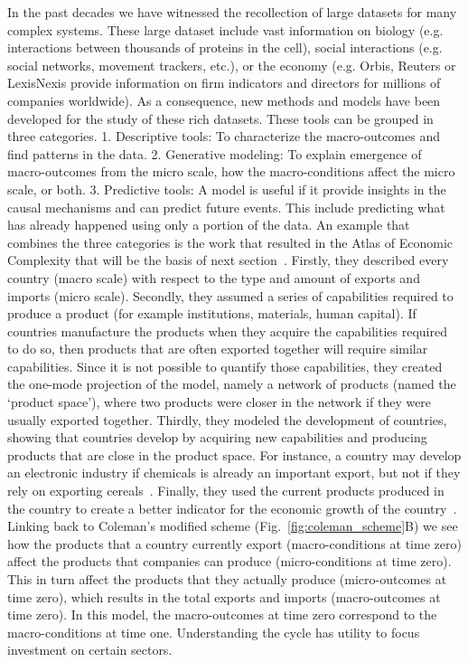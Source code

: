 In the past decades we have witnessed the recollection of large datasets for many complex systems. 
These large dataset include vast information on biology (e.g. interactions between thousands of proteins in the cell),
social interactions (e.g. social networks, movement trackers, etc.),
or the economy (e.g. Orbis, Reuters or LexisNexis provide information on firm indicators and directors for millions of companies worldwide).
As a consequence, new methods and models have been developed for the study of these rich datasets. 
These tools can be grouped in three categories.
1. Descriptive tools: To characterize the macro-outcomes and find patterns in the data.
2. Generative modeling: To explain emergence of macro-outcomes from the micro scale, how the macro-conditions affect the micro scale, or both.
3. Predictive tools: A model is useful if it provide insights in the causal mechanisms and can predict future events. This include predicting what has already happened using only a portion of the data. 
An example that combines the three categories is the work that resulted in the Atlas of Economic Complexity that will be the basis of next section~\citep{Hausmann2006,hidalgo2007,hidalgo2009,hausmann2011}.
Firstly, they described every country (macro scale) with respect to the type and amount of exports and imports (micro scale). 
Secondly, they assumed a series of capabilities required to produce a product (for example institutions, materials, human capital). 
If countries manufacture the products when they acquire the capabilities required to do so, 
then products that are often exported together will require similar capabilities.
Since it is not possible to quantify those capabilities, they created the one-mode projection of the model,
namely a network of products (named the `product space'), 
where two products were closer in the network if they were usually exported together. 
Thirdly, they modeled the development of countries, showing that countries develop by acquiring new capabilities and producing products that are close in the product space.
For instance, a country may develop an electronic industry if chemicals is already an important export, 
but not if they rely on exporting cereals~\citep{hidalgo2007}. 
Finally, they used the current products produced in the country to create a better indicator for the economic growth of the country~\citep{hausmann2011}.
Linking back to Coleman’s modified scheme (Fig.~\ref{fig:coleman_scheme}B) we see how the products that a country currently export (macro-conditions at time zero) affect the products that companies can produce (micro-conditions at time zero). 
This in turn affect the products that they actually produce (micro-outcomes at time zero), 
which results in the total exports and imports (macro-outcomes at time zero).
In this model, the macro-outcomes at time zero correspond to the macro-conditions at time one. 
Understanding the cycle has utility to focus investment on certain sectors.


